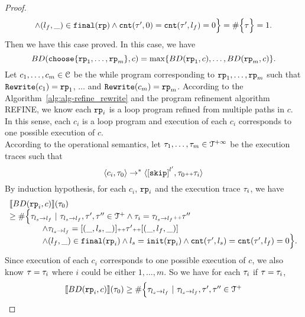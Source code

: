 \begin{proof}
\[\begin{array}{l}
    \land (l_{f}, \_) \in \mathtt{final}(\mathtt{rp})
    \land \mathtt{cnt}(\mathtt{\tau}', 0) = \mathtt{cnt}(\mathtt{\tau}', l_f) = 0 
    \Big\}
     = \# \Big\{\mathtt{\tau} \Big\} = 1.
  \end{array}
\]
Then we have this case proved.
In this case, we have
\[
  BD(\rpchoose{\rprog_1, \ldots, \rprog_m }, c) = \max\left\{ BD(\rprog_1, c), \ldots, BD(\rprog_m, c) \right\}.
\]
Let $c_1, \ldots, c_m \in \mathcal{C}$ be the while program corresponding to $\mathtt{rp}_1, \ldots, \mathtt{rp}_m$ such that $\mathtt{Rewrite}(c_1) = \mathtt{rp}_1$, $\ldots$ and  $\mathtt{Rewrite}(c_m) = \mathtt{rp}_m$.
According to the Algorithm~\ref{alg:alg-refine_rewrite} and the program refinement algorithm REFINE, we know each $\mathtt{rp}_i$ is a loop program refined from multiple paths in $c$.
\\
In this sense, each $c_i$ is a loop program and execution of each $c_i$ corresponds to one possible execution of $c$.
\\
According to the operational semantics, let $\mathtt{\tau}_1, \ldots, \mathtt{\tau}_m \in \mathcal{T}^{+\infty}$ be the execution traces such that 
\[
  \config{c_i, \trace_0} \to^* 
  \config{\clabel{\eskip}^{l'}, \trace_0 \tracecat \trace_i}
\]
By induction hypothesis, for each $c_i$, $\mathtt{rp}_i$ and the execution trace $\mathtt{\tau}_i$, we have 
\[
  \begin{array}{l}
  \llbracket BD(\mathtt{rp}_i, c) \rrbracket(\mathtt{\tau}_0) 
  \\ \geq
  \# \Big\{\mathtt{\tau}_{l_s \to l_f} ~\vert~ \mathtt{\tau}_{l_s \to l_f}, \mathtt{\tau}', \mathtt{\tau}''\in \mathcal{T}^{+}
  \land \mathtt{\tau}_i = \mathtt{\tau}_{l_s \to l_f} {\scriptscriptstyle ++} \mathtt{\tau}''
  \\ \qquad \qquad
  \land \mathtt{\tau}_{l_s \to l_f} = [(\_, l_s, \_)] {\scriptscriptstyle ++} \mathtt{\tau}' {\scriptscriptstyle ++} [(\_, l_f, \_)]
  \\ \qquad \qquad
  \land (l_{f}, \_) \in \mathtt{final}(\mathtt{rp}_i)
  \land l_s = \mathtt{init}(\mathtt{rp}_i)
  \land \mathtt{cnt}(\mathtt{\tau}', l_s) = \mathtt{cnt}(\mathtt{\tau}', l_f) = 0 
  \Big\}.
  \end{array}
\]
Since execution of each $c_i$ corresponds to one possible execution of $c$, we also know
$\mathtt{\tau} = \mathtt{\tau}_i$ where $i$ could be either $1, \ldots, m$.
So we have for each $\mathtt{\tau}_i$ if $\mathtt{\tau} = \mathtt{\tau}_i$, 
\[
  \begin{array}{l}
    \llbracket BD(\mathtt{rp}_i, c) \rrbracket(\mathtt{\tau}_0) \geq
    \# \Big\{\mathtt{\tau}_{l_s \to l_f} ~\vert~ \mathtt{\tau}_{l_s \to l_f}, \mathtt{\tau}', \mathtt{\tau}''\in \mathcal{T}^{+}

\end{array}\]
\end{proof}

